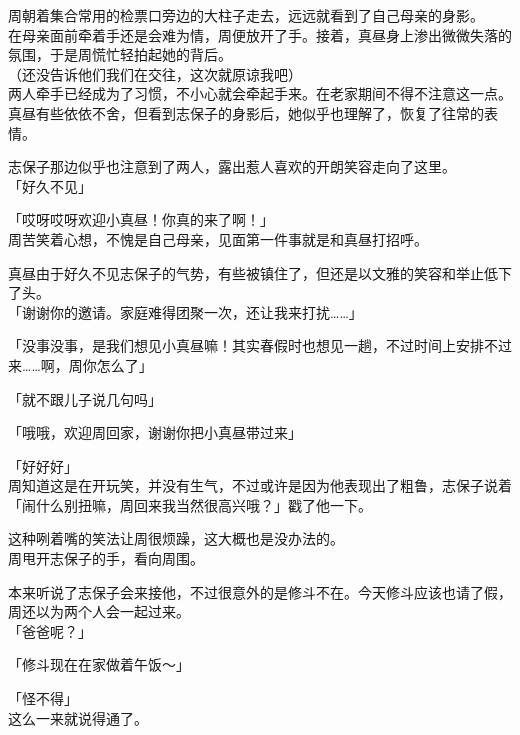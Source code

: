 周朝着集合常用的检票口旁边的大柱子走去，远远就看到了自己母亲的身影。\\

在母亲面前牵着手还是会难为情，周便放开了手。接着，真昼身上渗出微微失落的氛围，于是周慌忙轻拍起她的背后。\\

（还没告诉他们我们在交往，这次就原谅我吧）\\

两人牵手已经成为了习惯，不小心就会牵起手来。在老家期间不得不注意这一点。\\

真昼有些依依不舍，但看到志保子的身影后，她似乎也理解了，恢复了往常的表情。

志保子那边似乎也注意到了两人，露出惹人喜欢的开朗笑容走向了这里。\\

「好久不见」

「哎呀哎呀欢迎小真昼！你真的来了啊！」\\

周苦笑着心想，不愧是自己母亲，见面第一件事就是和真昼打招呼。

真昼由于好久不见志保子的气势，有些被镇住了，但还是以文雅的笑容和举止低下了头。\\

「谢谢你的邀请。家庭难得团聚一次，还让我来打扰……」

「没事没事，是我们想见小真昼嘛！其实春假时也想见一趟，不过时间上安排不过来……啊，周你怎么了」

「就不跟儿子说几句吗」

「哦哦，欢迎周回家，谢谢你把小真昼带过来」

「好好好」\\

周知道这是在开玩笑，并没有生气，不过或许是因为他表现出了粗鲁，志保子说着「闹什么别扭嘛，周回来我当然很高兴哦？」戳了他一下。

这种咧着嘴的笑法让周很烦躁，这大概也是没办法的。\\

周甩开志保子的手，看向周围。

本来听说了志保子会来接他，不过很意外的是修斗不在。今天修斗应该也请了假，周还以为两个人会一起过来。\\

「爸爸呢？」

「修斗现在在家做着午饭～」

「怪不得」\\

这么一来就说得通了。

